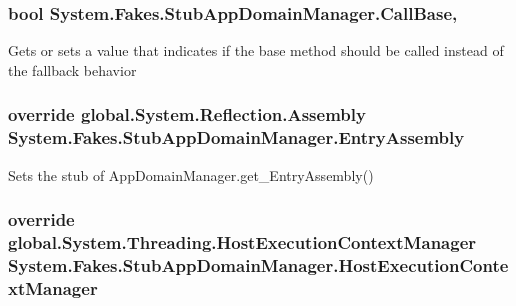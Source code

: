 \hypertarget{class_system_1_1_fakes_1_1_stub_app_domain_manager_a51da02ce59cb8f7b2db16f0684c63713}{
\subsubsection[{Call\-Base}]{\setlength{\rightskip}{0pt plus 5cm}bool System.\-Fakes.\-Stub\-App\-Domain\-Manager.\-Call\-Base\hspace{0.3cm}{\ttfamily [get]}, {\ttfamily [set]}}}\label{class_system_1_1_fakes_1_1_stub_app_domain_manager_a51da02ce59cb8f7b2db16f0684c63713}


Gets or sets a value that indicates if the base method should be called instead of the fallback behavior

\hypertarget{class_system_1_1_fakes_1_1_stub_app_domain_manager_ac5be91cb41102c75b5862b1f4c2eee41}{
\subsubsection[{Entry\-Assembly}]{\setlength{\rightskip}{0pt plus 5cm}override global.\-System.\-Reflection.\-Assembly System.\-Fakes.\-Stub\-App\-Domain\-Manager.\-Entry\-Assembly\hspace{0.3cm}{\ttfamily [get]}}}\label{class_system_1_1_fakes_1_1_stub_app_domain_manager_ac5be91cb41102c75b5862b1f4c2eee41}


Sets the stub of App\-Domain\-Manager.\-get\-\_\-\-Entry\-Assembly()

\hypertarget{class_system_1_1_fakes_1_1_stub_app_domain_manager_a982a24ef492311a1902081d30537bfc9}{
\subsubsection[{Host\-Execution\-Context\-Manager}]{\setlength{\rightskip}{0pt plus 5cm}override global.\-System.\-Threading.\-Host\-Execution\-Context\-Manager System.\-Fakes.\-Stub\-App\-Domain\-Manager.\-Host\-Execution\-Context\-Manager\hspace{0.3cm}{\ttfamily [get]}}}\label{class_system_1_1_fakes_1_1_stub_app_domain_manager_a982a24ef492311a1902081d30537bfc9}


